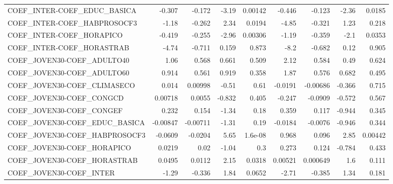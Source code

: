 \begin{tabular}{lrrrrrrrr}
COEF\_INTER-COEF\_EDUC\_BASICA          &      -0.307 &       -0.172 &   -3.19 &  0.00142 &     -0.446 &      -0.123 &        -2.36 &        0.0185 \\
COEF\_INTER-COEF\_HABPROSOCF3          &       -1.18 &       -0.262 &    2.34 &   0.0194 &      -4.85 &      -0.321 &         1.23 &         0.218 \\
COEF\_INTER-COEF\_HORAPICO             &      -0.419 &       -0.255 &   -2.96 &  0.00306 &      -1.19 &      -0.359 &         -2.1 &        0.0353 \\
COEF\_INTER-COEF\_HORASTRAB            &       -4.74 &       -0.711 &   0.159 &    0.873 &       -8.2 &      -0.682 &         0.12 &         0.905 \\
COEF\_JOVEN30-COEF\_ADULTO40           &        1.06 &        0.568 &   0.661 &    0.509 &       2.12 &       0.584 &         0.49 &         0.624 \\
COEF\_JOVEN30-COEF\_ADULTO60           &       0.914 &        0.561 &   0.919 &    0.358 &       1.87 &       0.576 &        0.682 &         0.495 \\
COEF\_JOVEN30-COEF\_CLIMASECO          &       0.014 &      0.00998 &   -0.51 &     0.61 &    -0.0191 &    -0.00686 &       -0.366 &         0.715 \\
COEF\_JOVEN30-COEF\_CONGCD             &     0.00718 &       0.0055 &  -0.832 &    0.405 &     -0.247 &     -0.0909 &       -0.572 &         0.567 \\
COEF\_JOVEN30-COEF\_CONGEF             &       0.232 &        0.154 &   -1.34 &     0.18 &      0.359 &       0.117 &       -0.944 &         0.345 \\
COEF\_JOVEN30-COEF\_EDUC\_BASICA        &    -0.00847 &     -0.00711 &   -1.31 &     0.19 &    -0.0184 &     -0.0076 &       -0.946 &         0.344 \\
COEF\_JOVEN30-COEF\_HABPROSOCF3        &     -0.0609 &      -0.0204 &    5.65 &  1.6e-08 &      0.968 &       0.096 &         2.85 &       0.00442 \\
COEF\_JOVEN30-COEF\_HORAPICO           &      0.0219 &         0.02 &   -1.04 &      0.3 &      0.273 &       0.124 &       -0.784 &         0.433 \\
COEF\_JOVEN30-COEF\_HORASTRAB          &      0.0495 &       0.0112 &    2.15 &   0.0318 &    0.00521 &    0.000649 &          1.6 &         0.111 \\
COEF\_JOVEN30-COEF\_INTER              &       -1.29 &       -0.336 &    1.84 &   0.0652 &      -2.71 &      -0.385 &         1.34 &         0.181 \\

\end{tabular}
